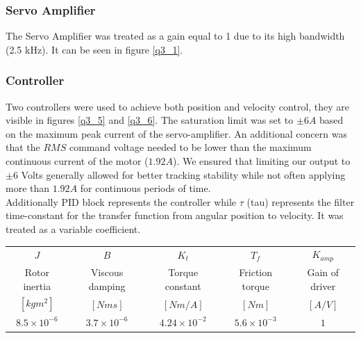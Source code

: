 \documentclass{article}
\theoremstyle{plain}
\theoremstyle{definition}
\theoremstyle{remark}
\begin{document}
\subsubsection*{Servo Amplifier}
The Servo Amplifier was treated as a gain equal to 1 due to its high bandwidth (2.5 kHz). It can be seen in figure \ref{q3_1}.

\subsubsection*{Controller}
Two controllers were used to achieve both position and velocity control, they are visible in figures \ref{q3_5} and \ref{q3_6}. The saturation limit was set to $\pm 6 A$ based on the maximum peak current of the servo-amplifier. An additional concern was that the $RMS$ command voltage needed to be lower than the maximum continuous current of the motor ($1.92 A$). We ensured that limiting our output to $\pm 6$ Volts generally allowed for better tracking stability while not often applying more than $1.92 A$ for continuous periods of time.\\

Additionally PID block represents the controller while $\tau$ (tau) represents the filter time-constant for the transfer function from angular position to velocity. It was treated as a variable coefficient.\\

\begin{table}[htb]
\begin{center}
    \begin{tabular}{|c|c|c|c|c|}
        \hline
        $J$                   & $B$                   &$K_t$                   & $T_f$                  & $K_{amp}$           \\
        Rotor inertia       & Viscous damping     & Torque constant      & Friction torque     & Gain of driver \\ 
        $[kgm^2]$           & $[Nms]$             & $[Nm/A]$             & $[Nm]$              & $[A/V]$        \\ \hline
        $8.5\times 10^{-6}$ & $3.7\times 10^{-6}$ & $4.24\times 10^{-2}$ & $5.6\times 10^{-3}$ & $1$            \\
        \hline
    \end{tabular}
\end{center}
\end{table}
\end{document}
